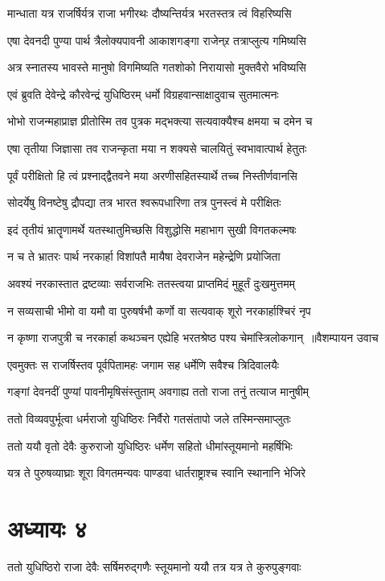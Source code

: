 \twolineshloka
{मान्धाता यत्र राजर्षिर्यत्र राजा भगीरथः}
{दौष्यन्तिर्यत्र भरतस्तत्र त्वं विहरिष्यसि}


\twolineshloka
{एषा देवनदी पुण्या पार्थ त्रैलोक्यपावनी}
{आकाशगङ्गा राजेन्र्र तत्राप्लुत्य गमिष्यसि}


\twolineshloka
{अत्र स्नातस्य भावस्ते मानुषो विगमिष्यति}
{गतशोको निरायासो मुक्तवैरो भविष्यसि}


\twolineshloka
{एवं ब्रुवति देवेन्द्रे कौरवेन्द्रं युधिष्ठिरम्}
{धर्मो विग्रहवान्साक्षादुवाच सुतमात्मनः}


\twolineshloka
{भोभो राजन्महाप्राज्ञ प्रीतोस्मि तव पुत्रक}
{मद्भक्त्या सत्यवाक्यैश्च क्षमया च दमेन च}


\twolineshloka
{एषा तृतीया जिज्ञासा तव राजन्कृता मया}
{न शक्यसे चालयितुं स्वभावात्पार्थ हेतुतः}


\twolineshloka
{पूर्वं परीक्षितो हि त्वं प्रश्नाद्द्वैतवने मया}
{अरणीसहितस्यार्थे तच्च निस्तीर्णवानसि}


\twolineshloka
{सोदर्येषु विनष्टेषु द्रौपद्या तत्र भारत}
{श्वरूपधारिणा तत्र पुनस्त्वं मे परीक्षितः}


\twolineshloka
{इदं तृतीयं भ्रातॄणामर्थे यतस्थातुमिच्छसि}
{विशुद्धोसि महाभाग सुखी विगतकल्मषः}


\twolineshloka
{न च ते भ्रातरः पार्थ नरकार्हा विशांपतै}
{मायैषा देवराजेन महेन्द्रेणि प्रयोजिता}


\twolineshloka
{अवश्यं नरकास्तात द्रष्टव्याः सर्वराजभिः}
{ततस्त्वया प्राप्तमिदं मुहूर्तं दुःखमुत्तमम्}


\twolineshloka
{न सव्यसाची भीमो वा यमौ वा पुरुषर्षभौ}
{कर्णो वा सत्यवाक् शूरो नरकार्हाश्चिरं नृप}


\threelineshloka
{न कृष्णा राजपुत्री च नरकार्हा कथञ्चन}
{एह्येहि भरतश्रेष्ठ पश्य चेमांस्त्रिलोकगान् ॥वैशम्पायन उवाच}
{}


\twolineshloka
{एवमुक्तः स राजर्षिस्तव पूर्वपितामहः}
{जगाम सह धर्मेणि सवैश्च त्रिदिवालयैः}


\twolineshloka
{गङ्गां देवनदीं पुण्यां पावनीमृषिसंस्तुताम्}
{अवगाह्य ततो राजा तनुं तत्याज मानुषीम्}


\twolineshloka
{ततो विव्यवपुर्भूत्वा धर्मराजो युधिष्ठिरः}
{निर्वैरो गतसंतापो जले तस्मिन्समाप्लुतः}


\twolineshloka
{ततो ययौ वृतो देवैः कुरुराजो युधिष्ठिरः}
{धर्मेण सहितो धीमांस्तूयमानो महर्षिभिः}


\twolineshloka
{यत्र ते पुरुषव्याघ्राः शूरा विगतमन्यवः}
{पाण्डवा धार्तराष्ट्राश्च स्वानि स्थानानि भेजिरे}


\chapter{अध्यायः ४}
\twolineshloka
{ततो युधिष्ठिरो राजा देवैः सर्षिमरुद्गणैः}
{स्तूयमानो ययौ तत्र यत्र ते कुरुपुङ्गवाः}


